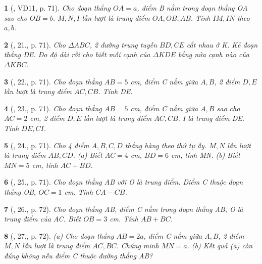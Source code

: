 \documentclass{article}
\newtheorem{baitoan}{}
\begin{document}
\begin{baitoan}[\cite{Binh_Toan_6_tap_2}, VD11, p. 71]
	Cho đoạn thẳng $OA = a$, điểm B nằm trong đoạn thẳng OA sao cho $OB = b$. $M,N,I$ lần lượt là trung điểm $OA,OB,AB$. Tính  $IM,IN$ theo $a,b$.
\end{baitoan}

\begin{baitoan}[\cite{Binh_Toan_6_tap_2}, 21., p. 71]
	Cho $\Delta ABC$, 2 đường trung tuyến $BD,CE$ cắt nhau ở K. Kẻ đoạn thẳng DE. Đo độ dài rồi cho biết mỗi cạnh của $\Delta KDE$ bằng nửa cạnh nào của $\Delta KBC$.
\end{baitoan}

\begin{baitoan}[\cite{Binh_Toan_6_tap_2}, 22., p. 71]
	Cho đoạn thẳng $AB = 5$ {\rm cm}, điểm C nằm giữa $A,B$, 2 điểm $D,E$ lần lượt là trung điểm $AC,CB$. Tính  DE.
\end{baitoan}

\begin{baitoan}[\cite{Binh_Toan_6_tap_2}, 23., p. 71]
	Cho đoạn thẳng $AB = 5$ {\rm cm}, điểm C nằm giữa $A,B$ sao cho $AC = 2$ {\rm cm}, 2 điểm $D,E$ lần lượt là trung điểm $AC,CB$. I là trung điểm DE. Tính  $DE,CI$.
\end{baitoan}

\begin{baitoan}[\cite{Binh_Toan_6_tap_2}, 24., p. 71]
	Cho 4 điểm $A,B,C,D$ thẳng hàng theo thứ tự ấy. $M,N$ lần lượt là trung điểm $AB,CD$. (a) Biết $AC = 4$ {\rm cm}, $BD = 6$ {\rm cm}, tính MN. (b) Biết $MN = 5$ {\rm cm}, tính $AC + BD$.
\end{baitoan}

\begin{baitoan}[\cite{Binh_Toan_6_tap_2}, 25., p. 71]
	Cho đoạn thẳng AB với O là trung điểm. Điểm C thuộc đoạn thẳng OB, $OC = 1$ {\rm cm}. Tính $CA - CB$.
\end{baitoan}

\begin{baitoan}[\cite{Binh_Toan_6_tap_2}, 26., p. 72]
	Cho đoạn thẳng AB, điểm C nằm trong đoạn thẳng AB, O là trung điểm của AC. Biết $OB = 3$ {\rm cm}. Tính $AB + BC$.
\end{baitoan}

\begin{baitoan}[\cite{Binh_Toan_6_tap_2}, 27., p. 72]
	(a) Cho đoạn thẳng $AB = 2a$, điểm C nằm giữa $A,B$, 2 điểm $M,N$ lần lượt là trung điểm $AC,BC$. Chứng minh $MN = a$. (b) Kết quả (a) còn đúng không nếu điểm C thuộc đường thẳng AB?
\end{baitoan}
\end{document}
